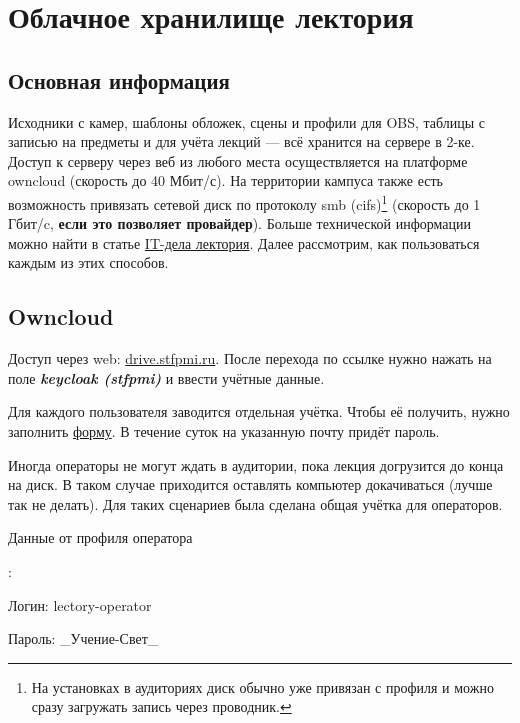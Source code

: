 \section{Облачное хранилище лектория}\label{sec:cloud-storage}

\subsection{Основная информация}

Исходники с камер, шаблоны обложек, сцены и профили для OBS, таблицы с записью на предметы и для учёта лекций --- всё хранится на сервере в 2-ке. Доступ к серверу через веб из любого места осуществляется на платформе owncloud (скорость до 40 Мбит/с). На территории кампуса также есть возможность привязать сетевой диск по протоколу smb (cifs)\footnote{На установках в аудиториях диск обычно уже привязан с профиля  и можно сразу загружать запись через проводник.} (скорость до 1 Гбит/c, \textbf{если это позволяет провайдер}). Больше технической информации можно найти в статье \href{https://wiki.stfpmi.ru/en/stfpmi/lectory/it}{IT-дела лектория}. Далее рассмотрим, как пользоваться каждым из этих способов.

\subsection{Owncloud}

Доступ через web: \href{https://drive.stfpmi.ru}{drive.stfpmi.ru}. После перехода по ссылке нужно нажать на поле \textit{\textbf{keycloak (stfpmi)}} и ввести учётные данные.

Для каждого пользователя заводится отдельная учётка. Чтобы её получить, нужно заполнить \href{https://forms.yandex.ru/u/64df964b02848f6809fb43af/}{форму}. В течение суток на указанную почту придёт пароль.

Иногда операторы не могут ждать в аудитории, пока лекция догрузится до конца на диск. В таком случае приходится оставлять компьютер докачиваться (лучше так не делать). Для таких сценариев была сделана общая учётка для операторов.

\hypertarget{lectory-operator-profile}{Данные от профиля оператора}:
\par\hspace{10pt} Логин: lectory-operator
\vspace{-5pt}
\par\hspace{10pt} Пароль: \_Учение-Свет\_

